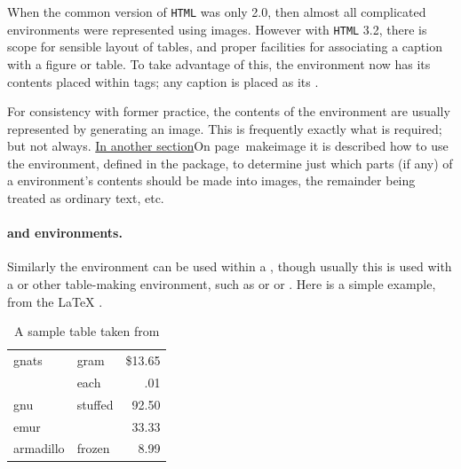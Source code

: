 When the common version of \texttt{HTML} was only 2.0, then almost all
complicated environments were represented using images. However with
\texttt{HTML} 3.2, there is scope for sensible layout of tables,
and proper facilities for associating a caption with a figure or table.
To take advantage of this, the  environment now has its
contents placed within  tags; any caption is placed
as its .

For consistency with former practice, the contents of the 
environment are usually represented by generating an image. 
This is frequently exactly what is required; but not always.
\hyperref[page]{In another section}{On page~}{}{makeimage} it is 
described how to use the  environment,
defined in the  package, to determine just which parts (if any)
of a  environment's contents should be made into images,
the remainder being treated as ordinary text, etc.

\medskip
{}%
\html{\\}%
\paragraph*{ and  environments.}

Similarly the  environment can be used within
a , though usually this is used with a 
or other table-making environment, such as  or
 or .
Here is a simple example, from the \LaTeX{} .

\begin{table}[hbt]
\begin{center}
\begin{tabular}{||l|lr||}   \hline
gnats   &       gram    &       \$13.65  \\ \cline{2-3}
        &       each    &        .01    \\ \hline
gnu     &       stuffed &        92.50  
                \\  \cline{1-1} \cline{3-3}
emur    &               &       33.33   \\ \hline
armadillo       & frozen        &       8.99 \\ \hline
\end{tabular}
\caption{A sample table taken from \protect\cite{lamp:latex}%
%
}%
\label{tab}
\end{center}
\end{table}

